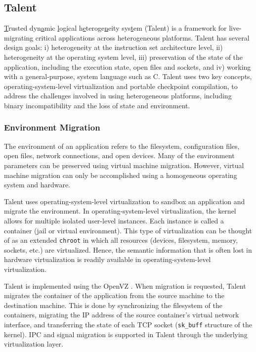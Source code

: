 \documentclass{acm_proc_article-sp}
\begin{document}
\subsection{Talent}
\underline{T}rusted dyn\underline{a}mic \underline{l}ogical h\underline{e}teroge\underline{n}eity sys\underline{t}em (Talent) \cite{talent} is a framework for live-migrating critical applications across heterogeneous platforms. Talent has several design goals: i) heterogeneity at the instruction set architecture level, ii) heterogeneity at the operating system level,
iii) preservation of the state of the application, including the execution state, open files and sockets, and iv) working with a general-purpose, system language such as C. Talent uses two key concepts, operating-system-level virtualization and portable checkpoint compilation, to address the challenges involved in using heterogeneous platforms, including binary incompatibility and the loss of state and environment.

\subsubsection{Environment Migration}

The environment of an application refers to the filesystem, configuration files, open files, network connections, and open devices. Many of the environment parameters can be preserved using virtual machine migration. However, virtual machine migration can only be accomplished using a homogeneous operating system and hardware. 

Talent uses operating-system-level virtualization to sandbox an application and migrate the environment. In operating-system-level virtualization, the kernel allows for multiple isolated user-level instances. Each instance is called a container (jail or virtual environment). This type of virtualization can be thought of as an extended \texttt{chroot} in which all resources (devices, filesystem, memory, sockets, etc.) are virtualized. Hence, the semantic information that is often lost in hardware virtualization is readily available in operating-system-level virtualization.

Talent is implemented using the OpenVZ \cite{openvz}. When migration is requested, Talent migrates the container of the application from the source machine to the destination machine. This is done by synchronizing the filesystem of the containers, migrating the IP address of the source container's virtual network interface, and transferring the state of each TCP socket (\texttt{sk\_buff} structure of the kernel). IPC and signal migration is supported in Talent through the underlying virtualization layer.
\end{document}
